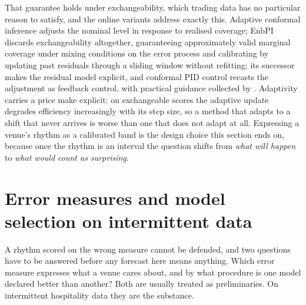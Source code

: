 That guarantee holds under exchangeability, which trading data has no particular
reason to satisfy, and the online variants address exactly this. Adaptive
conformal inference \citep{gibbs_adaptive_2021} adjusts the nominal level in
response to realised coverage; EnbPI \citep{xu_conformal_2021} discards
exchangeability altogether, guaranteeing approximately valid marginal coverage
under mixing conditions on the error process and calibrating by updating past
residuals through a sliding window without refitting; its successor
\citep{xu_sequential_2023} makes the residual model explicit, and conformal PID
control \citep{angelopoulos_conformal_2023-1} recasts the adjustment as feedback
control, with practical guidance collected by
\citet[a 2025 preprint]{stocker_gentle_2025}. Adaptivity carries a price
\citet{zaffran_adaptive_2022} make explicit: on exchangeable scores the adaptive
update degrades efficiency increasingly with its step size, so a method that
adapts to a shift that never arrives is worse than one that does not adapt at
all. Expressing a venue's rhythm as a calibrated band is the design choice this
section ends on, because once the rhythm is an interval the question shifts from
\emph{what will happen} to \emph{what would count as surprising}.

\section{Error measures and model selection on intermittent data}
\label{sec:rw-ruler}

A rhythm scored on the wrong measure cannot be defended, and two questions have
to be answered before any forecast here means anything. Which error measure
expresses what a venue cares about, and by what procedure is one model declared
better than another? Both are usually treated as preliminaries. On intermittent
hospitality data they are the substance.

